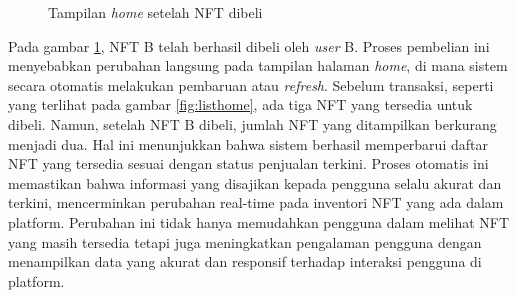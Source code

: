     \begin{figure} [H] \centering
    \caption{Tampilan \emph{home} setelah NFT dibeli}
    \label{fig:home_setelah_dibeli}
    \end{figure}
    
   Pada gambar \ref{fig:home_setelah_dibeli}, NFT B telah berhasil dibeli oleh \emph{user} B. Proses pembelian ini menyebabkan perubahan langsung pada tampilan halaman \emph{home}, di mana sistem secara otomatis melakukan pembaruan atau \emph{refresh}. Sebelum transaksi, seperti yang terlihat pada gambar \ref{fig:listhome}, ada tiga NFT yang tersedia untuk dibeli. Namun, setelah NFT B dibeli, jumlah NFT yang ditampilkan berkurang menjadi dua. Hal ini menunjukkan bahwa sistem berhasil memperbarui daftar NFT yang tersedia sesuai dengan status penjualan terkini. Proses otomatis ini memastikan bahwa informasi yang disajikan kepada pengguna selalu akurat dan terkini, mencerminkan perubahan real-time pada inventori NFT yang ada dalam platform. Perubahan ini tidak hanya memudahkan pengguna dalam melihat NFT yang masih tersedia tetapi juga meningkatkan pengalaman pengguna dengan menampilkan data yang akurat dan responsif terhadap interaksi pengguna di platform.
    
